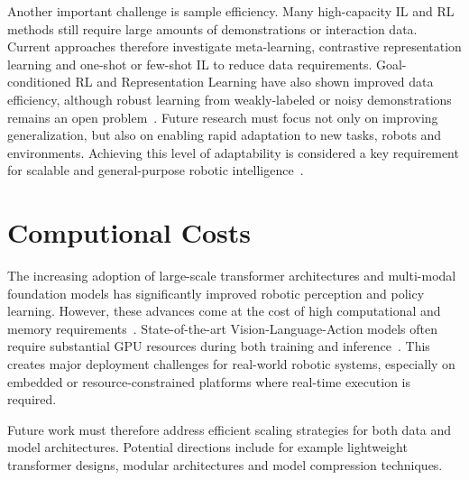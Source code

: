 Another important challenge is sample efficiency. Many high-capacity \ac{IL} and \ac{RL} methods still require large amounts of demonstrations or interaction data. Current approaches therefore investigate meta-learning, contrastive representation learning and one-shot or few-shot \ac{IL} to reduce data requirements. Goal-conditioned \ac{RL} and Representation Learning have also shown improved data efficiency, although robust learning from weakly-labeled or noisy demonstrations remains an open problem~\cite{Eze2024LearningBW}.
Future research must focus not only on improving generalization, but also on enabling rapid adaptation to new tasks, robots and environments. Achieving this level of adaptability is considered a key requirement for scalable and general-purpose robotic intelligence~\cite{Eze2024LearningBW}.







\section{Computional Costs}
The increasing adoption of large-scale transformer architectures and multi-modal foundation models has significantly improved robotic perception and policy learning. However, these advances come at the cost of high computational and memory requirements~\cite{Eze2024LearningBW}.
State-of-the-art Vision-Language-Action models often require substantial GPU resources during both training and inference~\cite{Black20240AV, Liu2024RDT1BAD, Kim2024OpenVLAAO}. This creates major deployment challenges for real-world robotic systems, especially on embedded or resource-constrained platforms where real-time execution is required.

Future work must therefore address efficient scaling strategies for both data and model architectures. Potential directions include for example lightweight transformer designs, modular architectures and model compression techniques.

